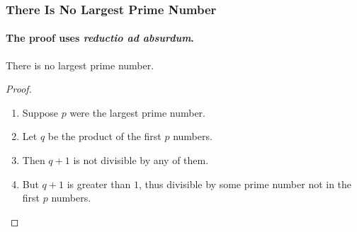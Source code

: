 \documentclass[12pt,ngerman]{beamer}
\begin{document}
\begin{frame}
\frametitle{There Is No Largest Prime Number}
\framesubtitle{The proof uses \textit{reductio ad absurdum}.}
\begin{theorem}
There is no largest prime number.
\end{theorem}
\begin{proof}
\begin{enumerate}
\item<1-| alert@1> Suppose $p$ were the largest prime number.
\item<2-> Let $q$ be the product of the first $p$ numbers.
\item<3-> Then $q+1$ is not divisible by any of them.
\item<1-> But $q + 1$ is greater than $1$, thus divisible by some prime
number not in the first $p$ numbers.\qedhere
\end{enumerate}
\end{proof}
\end{frame}
\end{document}
